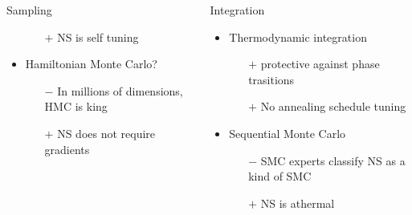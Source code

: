 \documentclass[aspectratio=169]{beamer}
\begin{document}
\begin{frame}
\begin{columns}[t]
\begin{block}{Sampling}
\begin{itemize}
\begin{itemize}
                        \item[$+$] NS is self tuning
                    \end{itemize}
                \item Hamiltonian Monte Carlo?
                    \begin{itemize}
                        \item[$-$] In millions of dimensions, HMC is king
                        \item[$+$] NS does not require gradients
                    \end{itemize}
            \end{itemize}
        \end{block}
        \begin{block}{Integration}
            \begin{itemize}
                \item Thermodynamic integration
                    \begin{itemize}
                        \item[$+$] protective against phase trasitions
                        \item[$+$] No annealing schedule tuning 
                    \end{itemize}
                \item Sequential Monte Carlo
                    \begin{itemize}
                        \item[$-$] SMC experts classify NS as a kind of SMC
                        \item[$+$] NS is athermal
                    \end{itemize}
            \end{itemize}
        \end{block}
    \end{columns}
\end{frame}
\end{document}
